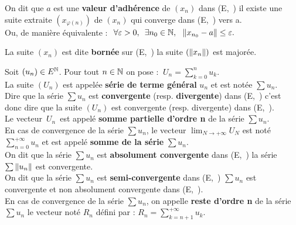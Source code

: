 \vspace{1.2cm}

On dit que $a$ est une \textbf{valeur d'adhérence} de \((x_n)\) dans (E,\ \normtxt{\ }) \ssi il existe une suite extraite \(\left(x_{\varphi (n)}\right)\) de \((x_n)\) qui converge dans (E,\ \normtxt{\ }) vers a.\vspace{0.1cm}\\
Ou, de manière équivalente : \(\displaystyle\ \forall \varepsilon >0,\ \,\exists n_0\in \NN,\ \ \norm{x_{n_0}-a}\leq \varepsilon.\)

\vspace{1cm}

La suite \((x_n)\) est dite \textbf{bornée} sur (E,\ \normtxt{\ }) \ssi la suite \((\left\lVert x_n\right\rVert)\) est majorée.

\vspace{1cm}

Soit \((u_n)\in E^{\mathbb{N}}\). Pour tout \(n\in \mathbb{N}\) on pose : \(\ \displaystyle U_n=\sum_{k=0}^nu_k.\)\vspace{0.2cm}\\
La suite \((U_n)\) est appelée \textbf{série de terme général} \(u_n\) et est notée \(\sum u_n\).\vspace{0.1cm}\\
Dire que la série \(\sum u_n\) est \textbf{convergente} (resp. \textbf{divergente}) dans (E,\ \normtxt{\ }) c'est donc dire que la suite \((U_n)\) est convergente (resp. divergente) dans (E,\ \normtxt{\ }).\vspace{0.3cm}\\
Le vecteur \(\,U_n\,\) est appelé \textbf{somme partielle d'ordre n} de la série \(\sum u_n\).\\
En cas de convergence de la série \(\sum u_n\), le vecteur \(\displaystyle \lim_{N\to +\infty}U_N\) est noté \(\displaystyle \sum_{n=0}^{+\infty}u_n\) et est appelé \textbf{somme de la série} \(\sum u_n\).\vspace{1cm}\\
On dit que la série \(\sum u_n\) est \textbf{absolument convergente} dans (E,\ \normtxt{\ }) \ssi la série \(\sum \left\lVert u_n\right\rVert\) est convergente.\vspace{0.1cm}\\
On dit que la série \(\sum u_n\) est \textbf{semi-convergente} dans (E,\ \normtxt{\ }) \ssi \(\sum u_n\) est convergente et non absolument convergente dans (E,\ \normtxt{\ }).\vspace{1cm}\\
En cas de convergence de la série \(\sum u_n\), on appelle \textbf{reste d'ordre n} de la série \(\sum u_n\) le vecteur noté \(R_n\) défini par : \(\displaystyle R_n =\sum_{k=n+1}^{+\infty}u_k. \)

